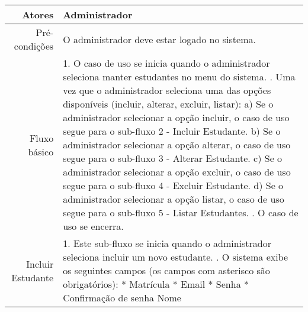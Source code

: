 \begin{longtable}{r p{12cm}}
\hline
Atores & Administrador \\ \hline
Pré-condições & O administrador deve estar logado no sistema.\\
Fluxo básico & 1. O caso de uso se inicia quando o administrador seleciona manter estudantes no menu do sistema. \newline
                2. Uma vez que o administrador seleciona uma das opções disponíveis (incluir, alterar, excluir, listar): \newline
                \hspace*{1cm} a) Se o administrador selecionar a opção incluir, o caso de uso segue para o sub-fluxo 2 - Incluir Estudante. \newline 
                \hspace*{1cm} b) Se o administrador selecionar a opção alterar, o caso de uso segue para o sub-fluxo 3 - Alterar Estudante.  \newline 
                \hspace*{1cm} c) Se o administrador selecionar a opção excluir, o caso de uso segue para o sub-fluxo 4 - Excluir Estudante.  \newline 
                \hspace*{1cm} d) Se o administrador selecionar a opção listar, o caso de uso segue para o sub-fluxo 5 - Listar Estudantes.  \newline 
                3. O caso de uso se encerra. \newline \\
Incluir Estudante & 1. Este sub-fluxo se inicia quando o administrador seleciona incluir um novo estudante. \newline
                    2. O sistema exibe os seguintes campos (os campos com asterisco são obrigatórios): \newline
                    \hspace*{1cm} * Matrícula \newline
                    \hspace*{1cm} * Email \newline
                    \hspace*{1cm} * Senha \newline
                    \hspace*{1cm} * Confirmação de senha \newline
                    \hspace*{1cm} Nome \newline

\end{longtable}
